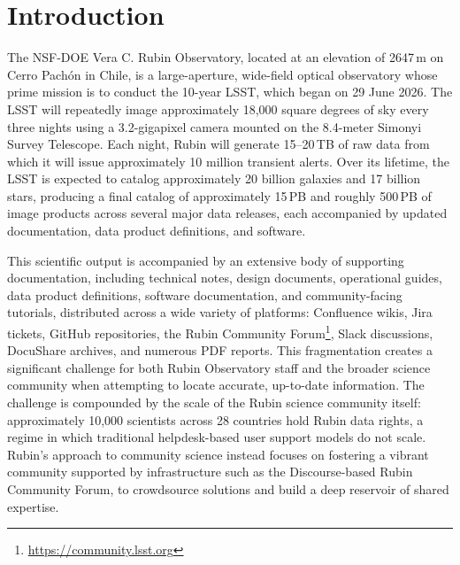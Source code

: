 \section{Introduction}
\label{sec:intro}
The NSF-DOE Vera C. Rubin Observatory\cite{2019ApJ...873..111I}, located at an elevation of 2647\,m on Cerro Pach\'{o}n in Chile, is a large-aperture, wide-field optical observatory whose prime mission is to conduct the 10-year \gls{LSST}, which began on 29 June 2026.
The \gls{LSST} will repeatedly image approximately 18,000 square degrees of sky every three nights using a 3.2-gigapixel camera mounted on the 8.4-meter \gls{Simonyi Survey Telescope}.
Each night, Rubin will generate 15--20\,TB of raw data from which it will issue approximately 10 million \gls{transient} alerts.
Over its lifetime, the \gls{LSST} is expected to catalog approximately 20 billion galaxies and 17 billion stars, producing a final catalog of approximately 15\,PB and roughly 500\,PB of image products across several major data releases, each accompanied by updated documentation, data product definitions, and software.

This scientific output is accompanied by an extensive body of supporting documentation, including technical notes, design documents, operational guides, data product definitions, software documentation, and community-facing tutorials, distributed across a wide variety of platforms: Confluence wikis, Jira tickets, GitHub repositories, the Rubin Community Forum\footnote{\url{https://community.lsst.org}}, Slack discussions, \gls{DocuShare} archives, and numerous PDF reports.
This fragmentation creates a significant challenge for both Rubin Observatory staff and the broader science community when attempting to locate accurate, up-to-date information.
The challenge is compounded by the scale of the Rubin science community itself: approximately 10,000 scientists across 28 countries hold Rubin data rights, a regime in which traditional helpdesk-based user support models do not scale\cite{RTN-097}.
Rubin's approach to community science instead focuses on fostering a vibrant community supported by infrastructure such as the Discourse-based Rubin Community Forum, to crowdsource solutions and build a deep reservoir of shared expertise\cite{RTN-121}.

